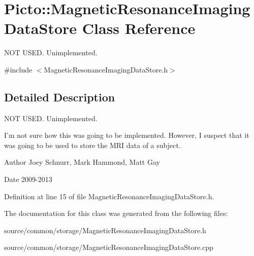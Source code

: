 \hypertarget{class_picto_1_1_magnetic_resonance_imaging_data_store}{\section{Picto\-:\-:Magnetic\-Resonance\-Imaging\-Data\-Store Class Reference}
\label{class_picto_1_1_magnetic_resonance_imaging_data_store}
}


N\-O\-T U\-S\-E\-D. Unimplemented.  




{\ttfamily \#include $<$Magnetic\-Resonance\-Imaging\-Data\-Store.\-h$>$}



\subsection{Detailed Description}
N\-O\-T U\-S\-E\-D. Unimplemented. 

I'm not sure how this was going to be implemented. However, I suspect that it was going to be used to store the M\-R\-I data of a subject. \begin{DoxyAuthor}{Author}
Joey Schnurr, Mark Hammond, Matt Gay 
\end{DoxyAuthor}
\begin{DoxyDate}{Date}
2009-\/2013 
\end{DoxyDate}


Definition at line 15 of file Magnetic\-Resonance\-Imaging\-Data\-Store.\-h.



The documentation for this class was generated from the following files\-:\begin{DoxyCompactItemize}
\item 
source/common/storage/Magnetic\-Resonance\-Imaging\-Data\-Store.\-h\item 
source/common/storage/Magnetic\-Resonance\-Imaging\-Data\-Store.\-cpp\end{DoxyCompactItemize}
